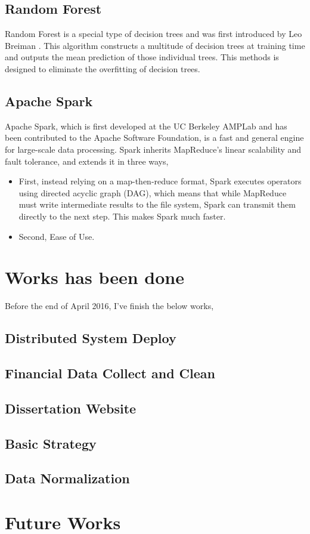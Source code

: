 \documentclass[12pt,a4paper]{scrartcl}
\begin{document}
	\subsection{Random Forest}
	Random Forest is a special type of decision trees and was first introduced by Leo Breiman \cite{breiman2001random}. This algorithm constructs a multitude of decision trees at training time and outputs the mean prediction of those individual trees. This methods is designed to eliminate the overfitting of decision trees.
	\subsection{Apache Spark}
	Apache Spark, which is first developed at the UC Berkeley AMPLab and has been contributed to the Apache Software Foundation, is a fast and general engine for large-scale data processing\cite{ryza2015advanced}. Spark inherits MapReduce's linear scalability and fault tolerance, and extends it in three ways,
	\begin{itemize}
		\item First, instead relying on a map-then-reduce format, Spark executes operators using directed acyclic graph (DAG), which means that while MapReduce must write intermediate results to the file system, Spark can transmit them directly to the next step. This makes Spark much faster.
		\item Second, Ease of Use.
	\end{itemize}
	\section{Works has been done}
	Before the end of April 2016, I've finish the below works,
	\subsection{Distributed System Deploy}
	\subsection{Financial Data Collect and Clean}
	\subsection{Dissertation Website}
	\subsection{Basic Strategy}
	\subsection{Data Normalization}
	\section{Future Works}
	
\end{document}
